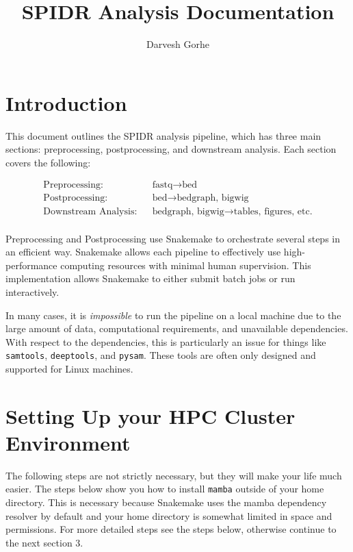 \documentclass{article}
\title{SPIDR Analysis Documentation}
\author{Darvesh Gorhe}
\begin{document}
    \maketitle
    \tableofcontents

    \section{Introduction}
    This document outlines the SPIDR analysis pipeline, which has three main sections: preprocessing, postprocessing, and downstream analysis. Each section covers the following:
    
    \begin{align*}
        \text{Preprocessing:} & & \text{fastq} \rightarrow \text{bed} \\
        \text{Postprocessing:} & & \text{bed} \rightarrow \text{bedgraph, bigwig} \\
        \text{Downstream Analysis:} & & \text{bedgraph, bigwig} \rightarrow \text{tables, figures, etc.} \\
    \end{align*}

    \noindent Preprocessing and Postprocessing use Snakemake to orchestrate several steps in an efficient way. Snakemake allows each pipeline to effectively use high-performance computing resources with minimal human supervision. This implementation allows Snakemake to either submit batch jobs or run interactively.
    \vspace{5mm}
    
    \noindent In many cases, it is \textit{impossible} to run the pipeline on a local machine due to the large amount of data, computational requirements, and unavailable dependencies. With respect to the dependencies, this is particularly an issue for things like \texttt{samtools}, \texttt{deeptools}, and \texttt{pysam}. These tools are often only designed and supported for Linux machines.
    \pagebreak

    \section{Setting Up your HPC Cluster Environment}
    The following steps are not strictly necessary, but they will make your life much easier. The steps below show you how to install \texttt{mamba} outside of your home directory. This is necessary because Snakemake uses the mamba dependency resolver by default and your home directory is somewhat limited in space and permissions. For more detailed steps see the steps below, otherwise continue to the next section 3.
    \vspace{5mm}
\end{document}
